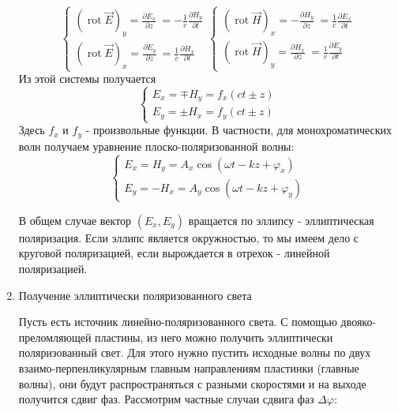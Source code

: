 \documentclass[a4paper,12pt]{article}
\renewcommand{\phi}{\ensuremath{\varphi}}
\theoremstyle{plain} %
\theoremstyle{definition} %
\theoremstyle{remark} %
\begin{document}
\begin{enumerate}
\begin{equation*}
\begin{cases}
\left(\operatorname{rot}\vec{E}\right)_y = \frac{\partial E_x}{\partial z}\ = -\frac{1}{c}\frac{\partial H_y}{\partial t}
\\
\left(\operatorname{rot}\vec{E}\right)_x = \frac{\partial E_y}{\partial z}\ = \frac{1}{c}\frac{\partial H_x}{\partial t}
\end{cases}
\begin{cases}
\left(\operatorname{rot}\vec{H}\right)_x = -\frac{\partial H_y}{\partial z}\ = \frac{1}{c}\frac{\partial E_x}{\partial t}
\\
\left(\operatorname{rot}\vec{H}\right)_y = \frac{\partial H_x}{\partial z}\ = \frac{1}{c}\frac{\partial E_y}{\partial t}
\end{cases}
\end{equation*} 
Из этой системы получается 
\begin{equation*}
\begin{cases}
E_x = \mp H_y = f_x(ct \pm z)
\\
E_y = \pm H_x = f_y(ct \pm z)
\end{cases}
\end{equation*}
Здесь $f_x$ и $f_y$ - произвольные функции. В частности, для монохроматических волн получаем уравнение плоско-поляризованной волны:
\begin{equation*}
\begin{cases}
E_x = H_y = A_x\cos(\omega t -kz+\phi_x)
\\
E_y = - H_x = A_y\cos(\omega t -kz + \phi_y )
\end{cases}
\end{equation*}

В общем случае вектор $\left(E_x,E_y\right)$ вращается по эллипсу - эллиптическая поляризация. Если эллипс является окружностью, то мы имеем дело с круговой поляризацией, если вырождается в отрехок - линейной поляризацией.

\item Получение эллиптически поляризованного света

Пусть есть источник линейно-поляризованного света. С помощью двояко-преломляющей пластины, из него можно получить эллиптически поляризованный свет. Для этого нужно пустить исходные волны по двух взаимо-перпенликулярным главным направлениям пластинки (главные волны), они будут распространяться с разными скоростями и на выходе получится сдвиг фаз. Рассмотрим частные случаи сдвига фаз $\Delta\phi$:


\end{enumerate}
\end{document}
